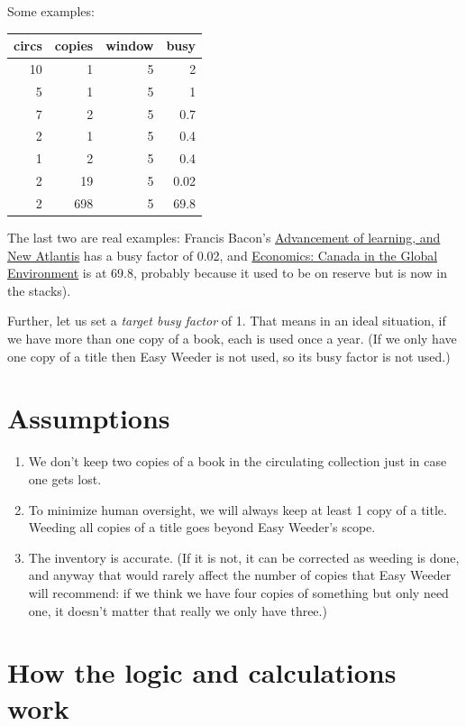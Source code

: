 \documentclass[11pt]{article}
\begin{document}
Some examples:

\begin{center}
\begin{tabular}{rrrr}
circs & copies & window & busy\\
\hline
10 & 1 & 5 & 2\\
5 & 1 & 5 & 1\\
7 & 2 & 5 & 0.7\\
2 & 1 & 5 & 0.4\\
1 & 2 & 5 & 0.4\\
2 & 19 & 5 & 0.02\\
2 & 698 & 5 & 69.8\\
\end{tabular}
\end{center}

The last two are real examples: Francis Bacon's \href{https://www.library.yorku.ca/find/Record/567179}{Advancement of learning, and New Atlantis} has a busy factor of 0.02, and \href{https://www.library.yorku.ca/find/Record/2914459}{Economics: Canada in the Global Environment} is at 69.8, probably because it used to be on reserve but is now in the stacks).

Further, let us set a \emph{target busy factor} of 1.  That means in an ideal situation, if we have more than one copy of a book, each is used once a year.  (If we only have one copy of a title then Easy Weeder is not used, so its busy factor is not used.)

\section*{Assumptions}
\label{sec:orgc8e7b1a}

\begin{enumerate}
\item We don't keep two copies of a book in the circulating collection just in case one gets lost.
\item To minimize human oversight, we will always keep at least 1 copy of a title.  Weeding all copies of a title goes beyond Easy Weeder's scope.
\item The inventory is accurate.  (If it is not, it can be corrected as weeding is done, and anyway that would rarely affect the number of copies that Easy Weeder will recommend: if we think we have four copies of something but only need one, it doesn't matter that really we only have three.)
\end{enumerate}

\section*{How the logic and calculations work}
\label{sec:orgaaef9dc}
\end{document}
